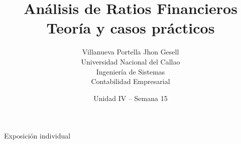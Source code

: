 \documentclass[12pt,a4paper]{article}
\title{\textbf{Análisis de Ratios Financieros}\\Teoría y casos prácticos}
\author{Villanueva Portella Jhon Gesell\\Universidad Nacional del Callao\\Ingeniería de Sistemas\\Contabilidad Empresarial}
\date{Unidad IV -- Semana 15}
\begin{document}
\maketitle
\begin{center}
Exposición individual
\end{center}
\newpage
\tableofcontents
\newpage

\newpage

\newpage

\newpage

\newpage

\newpage

\newpage

\newpage

\newpage

\newpage

\newpage

\newpage

\end{document}
